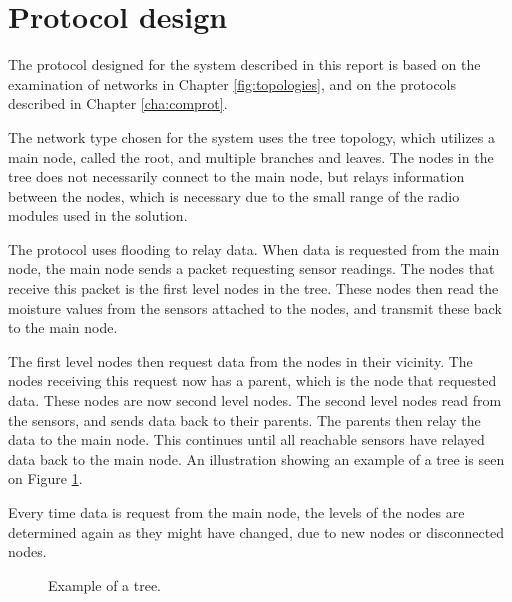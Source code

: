 \section{Protocol design}
The protocol designed for the system described in this report is based on the examination of networks in Chapter \ref{fig:topologies}, and on the protocols described in Chapter \ref{cha:comprot}.

The network type chosen for the system uses the tree topology, which utilizes a main node, called the root, and multiple branches and leaves. The nodes in the tree does not necessarily connect to the main node, but relays information between the nodes, which is necessary due to the small range of the radio modules used in the solution.

The protocol uses flooding to relay data. When data is requested from the main node, the main node sends a packet requesting sensor readings. The nodes that receive this packet is the first level nodes in the tree. These nodes then read the moisture values from the sensors attached to the nodes, and transmit these back to the main node. 

The first level nodes then request data from the nodes in their vicinity. The nodes receiving this request now has a parent, which is the node that requested data. These nodes are now second level nodes. The second level nodes read from the sensors, and sends data back to their parents. The parents then relay the data to the main node. This continues until all reachable sensors have relayed data back to the main node.
An illustration showing an example of a tree is seen on Figure \ref{fig:prottree1}.

Every time data is request from the main node, the levels of the nodes are determined again as they might have changed, due to new nodes or disconnected nodes.

\begin{figure}[!h]
	\centering
	\caption{Example of a tree.}
	\label{fig:prottree1}
\end{figure}


